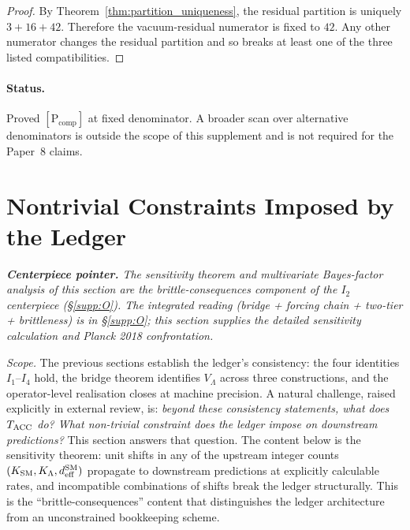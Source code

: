 \documentclass[11pt]{article}
\theoremstyle{plain}
\theoremstyle{definition}
\theoremstyle{remark}
\begin{document}
\begin{proof}
By Theorem~\ref{thm:partition_uniqueness}, the residual partition is uniquely $3 + 16 + 42$.  Therefore the vacuum-residual numerator is fixed to $42$.  Any other numerator changes the residual partition and so breaks at least one of the three listed compatibilities.
\end{proof}

\paragraph{Status.}
Proved $[\text{P}_{\mathrm{comp}}]$ at fixed denominator.  A broader scan over alternative denominators is outside the scope of this supplement and is not required for the Paper~8 claims.

\section{Nontrivial Constraints Imposed by the Ledger}\label{supp:Iprime}

\noindent\textit{\textbf{Centerpiece pointer.}  The sensitivity theorem and multivariate Bayes-factor analysis of this section are the brittle-consequences component of the $I_2$ centerpiece (\S\ref{supp:O}).  The integrated reading (bridge + forcing chain + two-tier + brittleness) is in \S\ref{supp:O}; this section supplies the detailed sensitivity calculation and Planck 2018 confrontation.}

\noindent\textit{Scope.}  The previous sections establish the ledger's consistency: the four identities $I_1$--$I_4$ hold, the bridge theorem identifies $V_\Lambda$ across three constructions, and the operator-level realisation closes at machine precision.  A natural challenge, raised explicitly in external review, is: \emph{beyond these consistency statements, what does $T_{\rm ACC}$ do?  What non-trivial constraint does the ledger impose on downstream predictions?}  This section answers that question.  The content below is the sensitivity theorem: unit shifts in any of the upstream integer counts $(K_{\rm SM}, K_\Lambda, d_{\rm eff}^{\rm SM})$ propagate to downstream predictions at explicitly calculable rates, and incompatible combinations of shifts break the ledger structurally.  This is the ``brittle-consequences'' content that distinguishes the ledger architecture from an unconstrained bookkeeping scheme.
\end{document}
